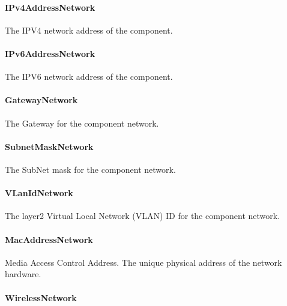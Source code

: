 \paragraph{IPv4AddressNetwork}\mbox{}
\label{sec:IPv4AddressNetwork}



The IPV4 network address of the component.



\paragraph{IPv6AddressNetwork}\mbox{}
\label{sec:IPv6AddressNetwork}



The IPV6 network address of the component.



\paragraph{GatewayNetwork}\mbox{}
\label{sec:GatewayNetwork}



The Gateway for the component network.


\paragraph{SubnetMaskNetwork}\mbox{}
\label{sec:SubnetMaskNetwork}



The SubNet mask for the component network.



\paragraph{VLanIdNetwork}\mbox{}
\label{sec:VLanIdNetwork}



The layer2 Virtual Local Network (VLAN) ID for the component network.


\paragraph{MacAddressNetwork}\mbox{}
\label{sec:MacAddressNetwork}



Media Access Control Address. The unique physical address of the network hardware.



\paragraph{WirelessNetwork}\mbox{}
\label{sec:WirelessNetwork}



